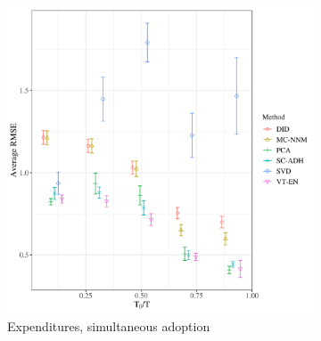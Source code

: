 \documentclass[12pt]{article}
\begin{document}
\begin{figure}[htbp]
	\centering
	\begin{subfigure}[t]{0.48\textwidth}
		\centering
		\includegraphics[width=\textwidth]{plots/exp_pc_N_17_T_159_numruns_20_num_treated_9_simultaneuous_1.png}
		\caption{Expenditures, simultaneous adoption}
	\end{subfigure}
	~ 
	\begin{subfigure}[t]{0.48\textwidth}
		\centering

\end{subfigure}
\end{figure}
\end{document}
